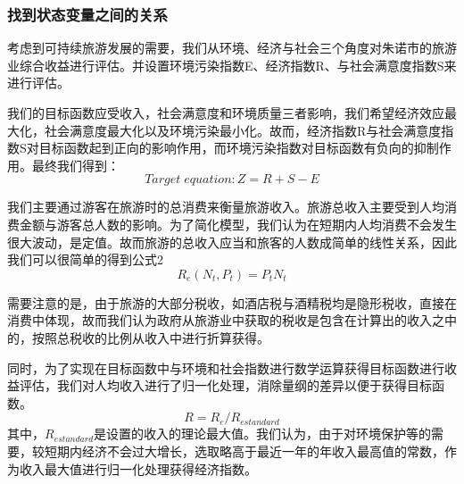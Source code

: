 \documentclass[12pt]{article}  %
\begin{document}
\subsubsection{找到状态变量之间的关系}
考虑到可持续旅游发展的需要，我们从环境、经济与社会三个角度对朱诺市的旅游业综合收益进行评估。并设置环境污染指数E、经济指数R、与社会满意度指数S来进行评估。

我们的目标函数应受收入，社会满意度和环境质量三者影响，我们希望经济效应最大化，社会满意度最大化以及环境污染最小化。故而，经济指数R与社会满意度指数S对目标函数起到正向的影响作用，而环境污染指数对目标函数有负向的抑制作用。最终我们得到：
\begin{equation}
	Target\; equation:Z=R+S-E
\end{equation}

我们主要通过游客在旅游时的总消费来衡量旅游收入。旅游总收入主要受到人均消费金额与游客总人数的影响。为了简化模型，我们认为在短期内人均消费不会发生很大波动，是定值。故而旅游的总收入应当和旅客的人数成简单的线性关系，因此我们可以很简单的得到公式2
\begin{equation}
    R_{e}(N_{t},P_{t}) = P_{t}N_{t}
\end{equation}

需要注意的是，由于旅游的大部分税收，如酒店税与酒精税均是隐形税收，直接在消费中体现，故而我们认为政府从旅游业中获取的税收是包含在计算出的收入之中的，按照总税收的比例从收入中进行折算获得。

同时，为了实现在目标函数中与环境和社会指数进行数学运算获得目标函数进行收益评估，我们对人均收入进行了归一化处理，消除量纲的差异以便于获得目标函数。
\begin{equation}
    R = R_{e}/R_{estandard}
\end{equation}
其中，$R_{estandard}$是设置的收入的理论最大值。我们认为，由于对环境保护等的需要，较短期内经济不会过大增长，选取略高于最近一年的年收入最高值的常数，作为收入最大值进行归一化处理获得经济指数。
\end{document}
